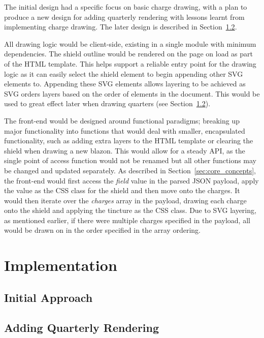 \documentclass[nobib, a4paper, twoside, justified]{tufte-book}
\begin{document}
The initial design had a specific focus on basic charge drawing, with a plan to produce a new
design for adding quarterly rendering with lessons learnt from implementing charge drawing. The
later design is described in Section~\ref{sec:adding_quarterly_rendering}.

All drawing logic would be client-side, existing in a single module with minimum dependencies. The
shield outline would be rendered on the page on load as part of the HTML template. This helps
support a reliable entry point for the drawing logic as it can easily select the shield element to
begin appending other SVG elements to. Appending these SVG elements allows layering to be achieved
as SVG orders layers based on the order of elements in the document. This would be used to great
effect later when drawing quarters (see Section~\ref{sec:adding_quarterly_rendering}).

The front-end would be designed around functional paradigms; breaking up major functionality into
functions that would deal with smaller, encapsulated functionality, such as adding extra layers to
the HTML template or clearing the shield when drawing a new blazon. This would allow for a steady
API, as the single point of access function would not be renamed but all other functions may be
changed and updated separately. As described in Section~\ref{sec:core_concepts}, the front-end
would first access the \textit{field} value in the parsed JSON payload, apply the value as the CSS
class for the shield and then move onto the charges. It would then iterate over the
\textit{charges} array in the payload, drawing each charge onto the shield and applying the
tincture as the CSS class. Due to SVG layering, as mentioned earlier, if there were multiple
charges specified in the payload, all would be drawn on in the order specified in the array
ordering.

\chapter{Implementation}%
\label{cha:implementation}

\section{Initial Approach}%
\label{sec:initial_approach}

\section{Adding Quarterly Rendering}%
\label{sec:adding_quarterly_rendering}
\end{document}
